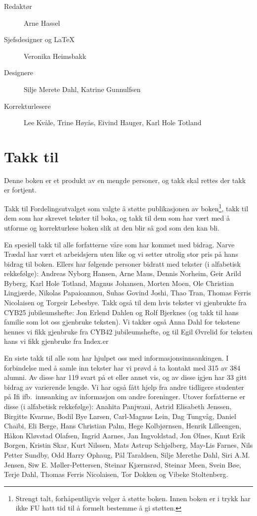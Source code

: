 \begin{description}
	\item[Redaktør] Arne Hassel
	\item[Sjefsdesigner og \LaTeX{}] Veronika Heimsbakk
	\item[Designere] Silje Merete Dahl, Katrine Gunnulfsen
	\item[Korrekturlesere] Lee Kvåle, Trine Høyås, Eivind Hauger, Karl Hole Totland
\end{description}

\section*{Takk til}

Denne boken er et produkt av en mengde personer, og takk skal rettes der takk er fortjent.

Takk til Fordelingsutvalget som valgte å støtte publikasjonen av boken\footnote{Strengt talt, forhåpentligvis velger å støtte boken. Innen boken er i trykk har ikke FU hatt tid til å formelt bestemme å gi støtten.}, takk til dem som har skrevet tekster til boka, og takk til dem som har vært med å utforme og korrekturlese boken slik at den blir så god som den kan bli.

En spesiell takk til alle forfatterne våre som har kommet med bidrag. Narve Trædal har vært et arbeidsjern uten like og vi setter utrolig stor pris på hans bidrag til boken. Ellers har følgende personer bidratt med tekster (i alfabetisk rekkefølge): Andreas Nyborg Hansen, Arne Maus, Dennis Norheim, Geir Arild Byberg, Karl Hole Totland, Magnus Johansen, Morten Moen, Ole Christian Lingjærde, Nikolas Papaioannou, Suhas Govind Joshi, Thao Tran, Thomas Ferris Nicolaisen og Torgeir Lebesbye. Takk også til dem hvis tekster vi gjenbrukte fra CYB25 jubileumshefte: Jon Erlend Dahlen og Rolf Bjerknes (og takk til hans familie som lot oss gjenbruke teksten). Vi takker også Anna Dahl for tekstene hennes vi fikk gjenbruke fra CYB42 jubileumshefte, og til Egil Øvrelid for teksten hans vi fikk gjenbruke fra Index.er 

En siste takk til alle som har hjulpet oss med informasjonsinnsankingen. I forbindelse med å samle inn tekster har vi prøvd å ta kontakt med 315 av 384 alumni. Av disse har 119 svart på et eller annet vis, og av disse igjen har 33 gitt bidrag av varierende lengde. Vi har også fått hjelp fra andre tidligere studenter på Ifi ifb.~innsanking av informasjon om andre foreninger. Utover forfatterne er disse (i alfabetisk rekkefølge): Anahita Panjwani, Astrid Elisabeth Jenssen, Birgitte Kvarme, Bodil Bye Larsen, Carl-Magnus Lein, Dag Tungvåg, Daniel Chaibi, Eli Berge, Hans Christian Palm, Hege Kolbjørnsen, Henrik Lilleengen, Håkon Kløvstad Olafsen, Ingrid Aarnes, Jan Ingvoldstad, Jon Ølnes, Knut Erik Borgen, Kristin Skar, Kurt Nilssen, Mats Astrup Schjølberg, May-Lis Farnes, Nils Petter Sundby, Odd Harry Ophaug, Pål Taraldsen, Silje Merethe Dahl, Siri A.M. Jensen, Siw E. Møller-Pettersen, Steinar Kjærnsrød, Steinar Meen, Svein Bøe, Terje Dahl, Thomas Ferris Nicolaisen, Tor Dokken og Vibeke Stoltenberg.


